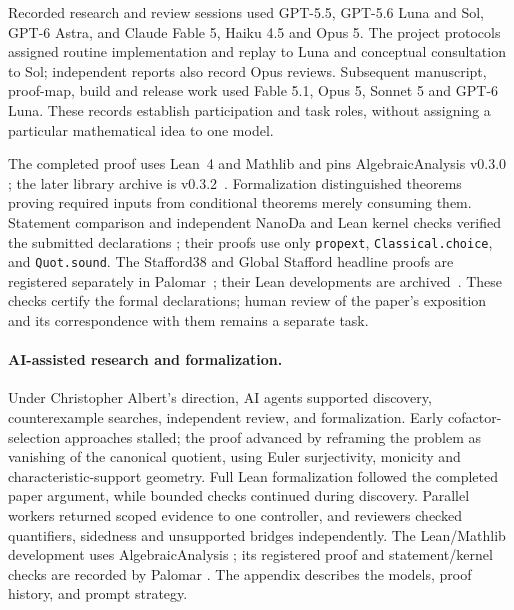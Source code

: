 Recorded research and review sessions used GPT-5.5, GPT-5.6 Luna and Sol,
GPT-6 Astra, and Claude Fable 5, Haiku 4.5 and Opus 5. The project protocols
assigned routine implementation and replay to Luna and conceptual
consultation to Sol; independent reports also record Opus reviews.
Subsequent manuscript, proof-map, build and release work used Fable 5.1,
Opus 5, Sonnet 5 and GPT-6 Luna. These records establish participation and task roles,
without assigning a particular mathematical idea to one model.

The completed proof uses Lean~4 and Mathlib and pins AlgebraicAnalysis v0.3.0
\cite{Lean4,Mathlib2020,AlgebraicAnalysis030}; the later library archive is v0.3.2~\cite{AlgebraicAnalysis032}.
Formalization distinguished theorems proving required inputs from
conditional theorems merely consuming them. Statement comparison and
independent NanoDa and Lean kernel checks verified the submitted declarations
\cite{Comparator,NanoDa,PalomarDocs}; their proofs use only
\texttt{propext}, \texttt{Classical.choice}, and \texttt{Quot.sound}.
The Stafford38 and Global Stafford headline proofs are registered separately in
Palomar~\cite{Stafford38Palomar2026,GlobalStaffordPalomar2026}; their Lean developments are archived~\cite{Stafford38Zenodo120,GlobalStaffordZenodo106}.
These checks certify the formal declarations; human review of the paper's
exposition and its correspondence with them remains a separate task.

\else
\paragraph{AI-assisted research and formalization.}
Under Christopher Albert's direction, AI agents supported discovery,
counterexample searches, independent review, and formalization. Early
cofactor-selection approaches stalled; the proof advanced by reframing
the problem as vanishing of the canonical quotient, using Euler
surjectivity, monicity and characteristic-support geometry. Full Lean
formalization followed the completed paper argument, while bounded checks
continued during discovery. Parallel workers returned scoped evidence to
one controller, and reviewers checked quantifiers, sidedness and unsupported
bridges independently. The Lean/Mathlib development uses AlgebraicAnalysis
\cite{Lean4,Mathlib2020,AlgebraicAnalysis030}; its registered proof and
statement/kernel checks are recorded by Palomar
\cite{Stafford38Palomar2026,Comparator,NanoDa,PalomarDocs}.
The appendix describes the models, proof history, and prompt strategy.
\fi
